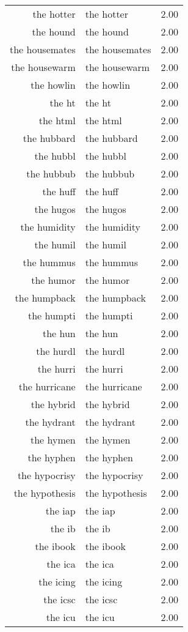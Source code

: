 \begin{table}[ht]
\begin{tabular}{rlr}
  the hotter & the hotter & 2.00 \\ 
  the hound & the hound & 2.00 \\ 
  the housemates & the housemates & 2.00 \\ 
  the housewarm & the housewarm & 2.00 \\ 
  the howlin & the howlin & 2.00 \\ 
  the ht & the ht & 2.00 \\ 
  the html & the html & 2.00 \\ 
  the hubbard & the hubbard & 2.00 \\ 
  the hubbl & the hubbl & 2.00 \\ 
  the hubbub & the hubbub & 2.00 \\ 
  the huff & the huff & 2.00 \\ 
  the hugos & the hugos & 2.00 \\ 
  the humidity & the humidity & 2.00 \\ 
  the humil & the humil & 2.00 \\ 
  the hummus & the hummus & 2.00 \\ 
  the humor & the humor & 2.00 \\ 
  the humpback & the humpback & 2.00 \\ 
  the humpti & the humpti & 2.00 \\ 
  the hun & the hun & 2.00 \\ 
  the hurdl & the hurdl & 2.00 \\ 
  the hurri & the hurri & 2.00 \\ 
  the hurricane & the hurricane & 2.00 \\ 
  the hybrid & the hybrid & 2.00 \\ 
  the hydrant & the hydrant & 2.00 \\ 
  the hymen & the hymen & 2.00 \\ 
  the hyphen & the hyphen & 2.00 \\ 
  the hypocrisy & the hypocrisy & 2.00 \\ 
  the hypothesis & the hypothesis & 2.00 \\ 
  the iap & the iap & 2.00 \\ 
  the ib & the ib & 2.00 \\ 
  the ibook & the ibook & 2.00 \\ 
  the ica & the ica & 2.00 \\ 
  the icing & the icing & 2.00 \\ 
  the icsc & the icsc & 2.00 \\ 
  the icu & the icu & 2.00 \\ 

\end{tabular}
\end{table}
